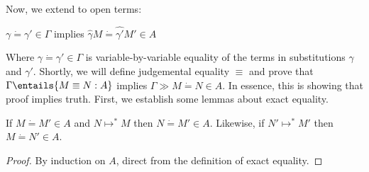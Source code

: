 \documentclass[letterpaper]{article}
\begin{document}
Now, we extend to open terms:


\begin{definition}[$\Gamma \gg M \dot{=} M' \in A$]
    $\gamma \dot{=} \gamma' \in \Gamma$ implies $\hat{\gamma} M \dot{=} \hat{\gamma'} M' \in A$ 
\end{definition}

Where $\gamma \dot{=} \gamma' \in \Gamma$ is variable-by-variable equality of the terms in substitutions $\gamma$ and $\gamma'$. 
Shortly, we will define judgemental equality $\equiv$ and prove that $\Gamma \entails{M \equiv N : A}$ implies $\Gamma \gg M \dot{=} N \in A$.
In essence, this is showing that proof implies truth. First, we establish some lemmas about exact equality.

\begin{lemma}\label{lem:headexpansion}
    If $M \dot{=} M' \in A$ and $N \mapsto^* M$ then $N \dot{=} M' \in A$. Likewise, if $N' \mapsto^* M'$ then $M \dot{=} N' \in A$. 
\end{lemma}
\begin{proof}
By induction on $A$, direct from the definition of exact equality.
\end{proof}
\end{document}

